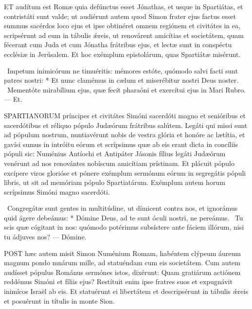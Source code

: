 

\lettrine[lines=2]{E}{T} audítum est Romæ quia defúnctus esset Jónathas, et usque in Spartiátas, et contristáti sunt valde; ut audiérunt autem quod Simon frater ejus factus esset summus sacérdos loco ejus et ipse obtinéret omnem regiónem et civitátes in ea, scripsérunt ad eum in tábulis ǽreis, ut renovárent amicítias et societátem, quam fécerant cum Juda et cum Jónatha frátribus ejus, et lectæ sunt in conspéctu ecclésiæ in Jerúsalem. Et hoc exémplum epistolárum, quas Spartiátæ misérunt.

\R\ Impetum inimicórum ne timuéritis: mémores estóte, quómodo salvi facti sunt patres nostri: * Et nunc clamémus in cælum et miserébitur nostri Deus noster. \V\ Mementóte mirabílium ejus, quæ fecit pharaóni et exercítui ejus in Mari Rubro. — Et.


\lettrine[lines=2]{S}{PARTIANORUM} príncipes et civitátes Simóni sacerdóti magno et senióribus et sacerdótibus et réliquo pópulo Judæórum frátribus salútem. Legáti qui missi sunt ad pópulum nostrum, nuntiavérunt nobis de vestra glória et honóre ac lætítia, et gavísi sumus in intróitu eórum et scrípsimus quæ ab eis erant dicta in concíliis pópuli sic: Numénius Antíochi et Antipáter Jásonis fílius legáti Judæórum venérunt ad nos renovántes nobíscum amicítiam prístinam. Et plácuit pópulo excípere viros glorióse et pónere exémplum sermónum eórum in segregátis pópuli libris, ut sit ad memóriam pópulo Spartiatárum. Exémplum autem horum scrípsimus Simóni magno sacerdóti.

\R\ Congregátæ sunt gentes in multitúdine, ut dímicent contra nos, et ignorámus quid ágere debeámus: * Dómine Deus, ad te sunt óculi nostri, ne pereámus. \V\ Tu scis quæ cógitant in nos: quómodo potérimus subsístere ante fáciem illórum, nisi tu ádjuves nos? — Dómine.



\lettrine[lines=2]{P}{OST} hæc autem misit Simon Numénium Romam, habéntem clýpeum áureum magnum pondo mnárum mille, ad statuéndam cum eis societátem. Cum autem audísset pópulus Románus sermónes istos, dixérunt: Quam gratiárum actiónem reddémus Simóni et fíliis ejus? Restítuit enim ipse fratres suos et expugnávit inimícos Israël ab eis. Et statuérunt ei libertátem et descripsérunt in tábulis ǽreis et posuérunt in títulis in monte Sion.

